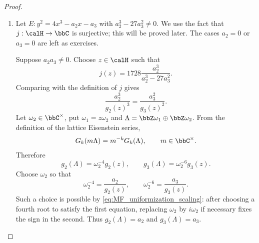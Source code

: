 \begin{proof}
\begin{enumerate}[label=(\arabic*)]
\begin{enumerate}[label=\textit{Step~\arabic*.}]
            \item Injectivity.
            Suppose $\varphi(z_1 + \Lambda) = \varphi(z_2 + \Lambda)$ for two nonzero classes. In particular,
            \[
                \wp_\Lambda(z_1) = \wp_\Lambda(z_2), \qquad \wp'_\Lambda(z_1) = \wp'_\Lambda(z_2).
            \]
            \begin{enumerate}[label=\textbf{Case~\arabic*}]
                \item $2z_1 \notin \Lambda$.
                The order-$2$ elliptic function $\wp_\Lambda(z) - \wp_\Lambda(z_1)$ vanishes at $z_1$, $-z_1$ and $z_2$. The first two are distinct modulo $\Lambda$, so $z_2 \equiv \pm z_1 \pmod{\Lambda}$. These zeros are simple, hence $\wp'_\Lambda(z_1) \neq 0$. Since $\wp'_\Lambda$ is odd and its values at $z_1$ and $z_2$ agree, the negative alternative is excluded. Thus $z_2 \equiv z_1 \pmod{\Lambda}$.
                \item $2z_1 \in \Lambda$.
                As above, $\wp_\Lambda(z) - \wp_\Lambda(z_1)$ has a double zero at $z_1$ and vanishes at $z_2$. Since its order is $2$, we have $z_2 \equiv z_1 \pmod{\Lambda}$.
            \end{enumerate}
            Only the zero class maps to the point at infinity, so $\varphi$ is injective.
        \end{enumerate}

        \item Let $E : y^2 = 4x^3 - a_2x - a_3$ with $a_2^3 - 27a_3^2 \neq 0$. We use the fact that $j : \calH \to \bbC$ is surjective; this will be proved later. The cases $a_2 = 0$ or $a_3 = 0$ are left as exercises.

        Suppose $a_2a_3 \neq 0$. Choose $z \in \calH$ such that
        \[
            j(z) = 1728\frac{a_2^3}{a_2^3 - 27a_3^2}.
        \]
        Comparing with the definition of $j$ gives
        \begin{equation}\label{eq:MF_uniformization_scaling}
            \frac{a_2^3}{g_2(z)^3} = \frac{a_3^2}{g_3(z)^2}.
        \end{equation}
        Let $\omega_2 \in \bbC^\times$, put $\omega_1 = z\omega_2$ and $\Lambda = \bbZ\omega_1 \oplus \bbZ\omega_2$. From the definition of the lattice Eisenstein series,
        \[
            G_k(m\Lambda) = m^{-k}G_k(\Lambda), \qquad m \in \bbC^\times.
        \]
        Therefore
        \[
            g_2(\Lambda) = \omega_2^{-4}g_2(z), \qquad g_3(\Lambda) = \omega_2^{-6}g_3(z).
        \]
        Choose $\omega_2$ so that
        \[
            \omega_2^{-4} = \frac{a_2}{g_2(z)}, \qquad \omega_2^{-6} = \frac{a_3}{g_3(z)}.
        \]
        Such a choice is possible by \eqref{eq:MF_uniformization_scaling}: after choosing a fourth root to satisfy the first equation, replacing $\omega_2$ by $i\omega_2$ if necessary fixes the sign in the second. Thus $g_2(\Lambda) = a_2$ and $g_3(\Lambda) = a_3$.
    \end{enumerate}
\end{proof}

